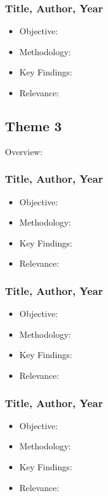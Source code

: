 \documentclass[11pt]{article}
\begin{document}
        \subsubsection{Title, Author, Year}
            \begin{itemize}
                \item Objective:
                \item Methodology:
                \item Key Findings:
                \item Relevance:
            \end{itemize}

\newpage
\subsection{Theme 3}
    Overview:
        \subsubsection{Title, Author, Year}
            \begin{itemize}
                \item Objective:
                \item Methodology:
                \item Key Findings:
                \item Relevance:
            \end{itemize}

        \subsubsection{Title, Author, Year}
            \begin{itemize}
                \item Objective:
                \item Methodology:
                \item Key Findings:
                \item Relevance:
            \end{itemize}

        \subsubsection{Title, Author, Year}
            \begin{itemize}
                \item Objective:
                \item Methodology:
                \item Key Findings:
                \item Relevance:
            \end{itemize}
\end{document}
